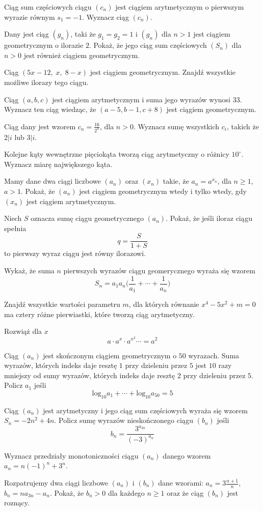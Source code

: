 \zadanie Ciąg sum częściowych ciągu $(c_n)$ jest ciągiem arytmetycznym o pierwszym wyrazie równym $s_1 = -1$. Wyznacz ciąg $(c_n)$.

\zadanie Dany jest ciąg $(g_n)$, taki że $g_1 = g_2 = 1$ i $(g_n)$ dla $n > 1$ jest ciągiem geometrycznym o ilorazie $2$. Pokaż, że jego ciąg sum częściowych $(S_n)$ dla $n > 0$ jest również ciągiem geometrycznym.

\zadanie Ciąg $(5x - 12,\;x,\;8 - x)$ jest ciągiem geometrycznym. Znajdź wszystkie możliwe ilorazy tego ciągu. %

\zadanie Ciąg $(a, b, c)$ jest ciągiem arytmetycznym i suma jego wyrazów wynosi $33$. Wyznacz ten ciąg wiedząc, że $(a - 5, b - 1, c + 8)$ jest ciągiem geometrycznym. 

\zadanie Ciąg dany jest wzorem $c_n = \frac{16}{2^n}$, dla $n > 0$. Wyznacz sumę wszystkich $c_i$, takich że $2|i$ lub $3|i$. %

\zadanie Kolejne kąty wewnętrzne pięciokąta tworzą ciąg arytmetyczny o różnicy $10^{\circ}$. Wyznacz miarę największego kąta. %

\zadanie Mamy dane dwa ciągi liczbowe $(a_n)$ oraz $(x_n)$ takie, że $a_n = a^{x_n}$, dla $n \geq 1$, $a > 1$. Pokaż, że $(a_n)$ jest ciągiem geometrycznym wtedy i tylko wtedy, gdy $(x_n)$ jest ciągiem arytmetycznym.

\zadanie Niech $S$ oznacza sumę ciągu geometrycznego $(a_n)$. Pokaż, że jeśli iloraz ciągu spełnia \[ q = \frac{S}{1 + S} \] to pierwszy wyraz ciągu jest równy ilorazowi.

\zadanie Wykaż, że suma $n$ pierwszych wyrazów ciągu geomerycznego wyraża się wzorem \[ S_n = a_1a_n\bigg(\frac{1}{a_1} + \cdots + \frac{1}{a_n}\bigg) \]

\zadanie Znajdź wszystkie wartości parametru $m$, dla których równanie $x^4 - 5x^2 + m = 0$ ma cztery różne pierwiastki, które tworzą ciąg arytmetyczny. %

\zadanie Rozwiąż dla $x$ \[a \cdot a^x \cdot a^{x^2} \cdots = a^2 \]

\zadanie Ciąg $(a_n)$ jest skończonym ciągiem geometrycznym o $50$ wyrazach. Suma wyrazów, których indeks daje resztę $1$ przy dzieleniu przez $5$ jest $10$ razy mniejszy od sumy wyrazów, których indeks daje resztę $2$ przy dzieleniu przez $5$. Policz $a_1$ jeśli \[ \text{log}_{10}a_1 + \cdots + \text{log}_{10}a_{50} = 5 \]

\zadanie Ciąg $(a_n)$ jest arytmetyczny i jego ciąg sum częściowych wyraża się wzorem $S_n = -2n^2 + 4n$. Policz sumę wyrazów nieskończonego ciągu $(b_n)$ jeśli \[ b_n = \dfrac{3^{a_{2n}}}{(-3)^{a_n}} \] %

\zadanie Wyznacz przedziały monotoniczności ciągu $(a_n)$ danego wzorem $a_n = n(-1)^n + 3^n$.

\zadanie Rozpatrujemy dwa ciągi liczbowe $(a_n)$ i $(b_n)$ dane wzorami: $a_n = 3\frac{n + 1}{n}$, $b_n = na_{3n} - a_n$. Pokaż, że $b_n > 0$ dla każdego $n \geqslant 1$ oraz że ciąg $(b_n)$ jest roznący.